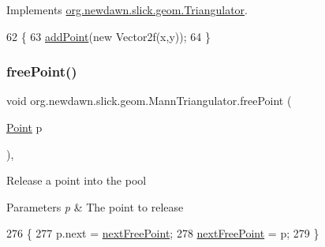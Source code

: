 Implements \mbox{\hyperlink{interfaceorg_1_1newdawn_1_1slick_1_1geom_1_1_triangulator_a32b11eccb582c7f4993a944df0b1db65}{org.\+newdawn.\+slick.\+geom.\+Triangulator}}.


\begin{DoxyCode}
62                                                \{
63         \mbox{\hyperlink{classorg_1_1newdawn_1_1slick_1_1geom_1_1_mann_triangulator_a596f4e31b0c8294d3a75115323d5c458}{addPoint}}(\textcolor{keyword}{new} Vector2f(x,y));
64     \}
\end{DoxyCode}
\mbox{\label{classorg_1_1newdawn_1_1slick_1_1geom_1_1_mann_triangulator_a6fdee2c105fe975a171f17378f677d2e}} 
\subsubsection{\texorpdfstring{free\+Point()}{freePoint()}}
{\footnotesize\ttfamily void org.\+newdawn.\+slick.\+geom.\+Mann\+Triangulator.\+free\+Point (\begin{DoxyParamCaption}\item[{\mbox{\hyperlink{classorg_1_1newdawn_1_1slick_1_1geom_1_1_mann_triangulator_1_1_point}{Point}}}]{p }\end{DoxyParamCaption})\hspace{0.3cm}{\ttfamily [inline]}, {\ttfamily [private]}}

Release a point into the pool


\begin{DoxyParams}{Parameters}
{\em p} & The point to release \\
\hline
\end{DoxyParams}

\begin{DoxyCode}
276                                     \{
277         p.next = \mbox{\hyperlink{classorg_1_1newdawn_1_1slick_1_1geom_1_1_mann_triangulator_a118a96eab8295cfebe18ec95b0236640}{nextFreePoint}};
278         \mbox{\hyperlink{classorg_1_1newdawn_1_1slick_1_1geom_1_1_mann_triangulator_a118a96eab8295cfebe18ec95b0236640}{nextFreePoint}} = p;
279     \}
\end{DoxyCode}
\mbox{\label{classorg_1_1newdawn_1_1slick_1_1geom_1_1_mann_triangulator_af2f8f368371dd9ef7588356127aaad05}} 
